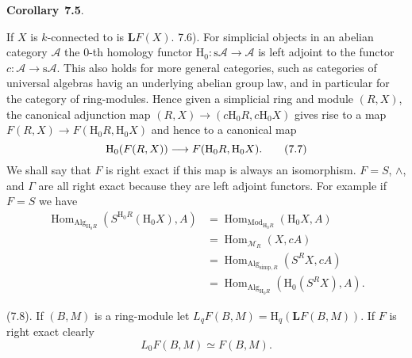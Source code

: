 \documentclass[10pt,reqno]{amsart}
\DeclareMathOperator{\Hom}{Hom}
\newenvironment{env}[2]{
\par\medskip\noindent\textbf{#1}~\textbf{#2}.\,\itshape
}
\newcommand{\lra}{\longrightarrow}
\newcommand{\cat}{\mathcal}
\newcommand{\A}{\cat{A}}
\newcommand{\sA}{\mathrm{s}\A}
\newcommand{\M}{\cat{M}}
\renewcommand{\L}{\mathbf{L}}
\renewcommand{\H}{\mathrm{H}}
\newcommand{\Mod}[1]{\mathrm{Mod}_{#1}}
\newcommand{\Alg}[1]{\mathrm{Alg}_{#1}}
\begin{document}
\begin{env}{Corollary}{7.5}
If $X$ is $k$-connected to is $\L F(X)$.
\end{env}

(7.6). For simplicial objects in an abelian category $\A$ the $0$-th homology functor
$\H_0:\sA\to\A$ is left adjoint to the functor $c:\A\to\sA$. This also holds for more
general categories, such as categories of universal algebras havig an underlying abelian
group law, and in particular for the category of ring-modules. Hence given a simplicial
ring and module $(R,X)$, the canonical adjunction map $(R,X)\to(c\H_0 R,c\H_0 X)$ gives
rise to a map $F(R,X)\to F(\H_0 R,\H_0 X)$ and hence to a canonical map
\[
  \H_0(F(R,X))\lra F(\H_0 R,\H_0 X).\tag{7.7}
\]
We shall say that $F$ is right exact if this map is always an isomorphism.
$F=S$, $\wedge$, and $\Gamma$ are all right exact because they are left adjoint
functors. For example if $F=S$ we have
\begin{align*}
  \Hom_{\Alg{\H_0 R}}(S^{\H_0 R}(\H_0 X),A)&=\Hom_{\Mod{\H_0 R}}(\H_0 X,A)\\
  &=\Hom_{\M_R}(X,cA)\\
  &=\Hom_{\Alg{\text{simp},R}}(S^R X,cA)\\
  &=\Hom_{\Alg{\H_0 R}}(\H_0(S^R X),A).
\end{align*}

(7.8). If $(B,M)$ is a ring-module let $L_q F(B,M)=\H_q(\L F(B,M))$. If $F$ is
right exact clearly
\[
  L_0 F(B,M)\simeq F(B,M).
\]
\end{document}
